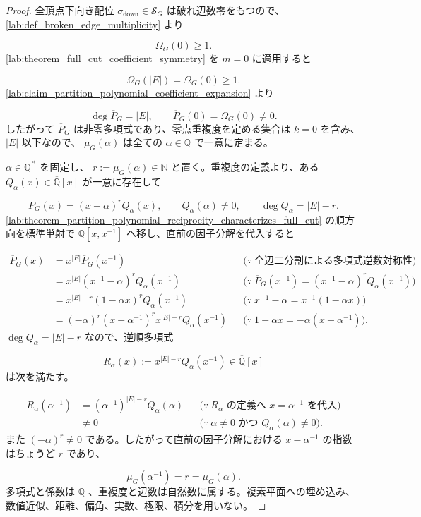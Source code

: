 \documentclass[11pt,a4paper]{article}
\theoremstyle{remark}
\begin{document}
\begin{proof}
全頂点下向き配位 
$\sigma_{\mathsf{down}}\in\mathcal S_G$
 は破れ辺数零をもつので、
\cref{lab:def_broken_edge_multiplicity}
 より

\[\Omega_G(0)\geq1.\]
\cref{lab:theorem_full_cut_coefficient_symmetry}
 を 
$m=0$
 に適用すると

\[\Omega_G(|E|)=\Omega_G(0)\geq1.\]
\cref{lab:claim_partition_polynomial_coefficient_expansion}
 より

\[\deg\overline P_G=|E|,
\qquad
\overline P_G(0)=\Omega_G(0)\ne0.\]
したがって 
$\overline P_G$
 は非零多項式であり、零点重複度を定める集合は 
$k=0$
 を含み、
$|E|$
 以下なので、
$\mu_G(\alpha)$
 は全ての 
$\alpha\in\overline{\mathbb Q}$
 で一意に定まる。

$\alpha\in\overline{\mathbb Q}^{\times}$
 を固定し、
$r:=\mu_G(\alpha)\in\mathbb N$
 と置く。重複度の定義より、ある 
$Q_\alpha(x)\in\overline{\mathbb Q}[x]$
 が一意に存在して

\[\overline P_G(x)=(x-\alpha)^rQ_\alpha(x),
\qquad
Q_\alpha(\alpha)\ne0,
\qquad
\deg Q_\alpha=|E|-r.\]
\cref{lab:theorem_partition_polynomial_reciprocity_characterizes_full_cut}
 の順方向を標準単射で 
$\overline{\mathbb Q}[x,x^{-1}]$
 へ移し、直前の因子分解を代入すると

\[\begin{aligned}
\overline P_G(x)
&=x^{|E|}\overline P_G(x^{-1})
&&\bigl(\because\ \text{全辺二分割による多項式逆数対称性}\bigr)\\
&=x^{|E|}(x^{-1}-\alpha)^rQ_\alpha(x^{-1})
&&\bigl(\because\ \overline P_G(x^{-1})=(x^{-1}-\alpha)^rQ_\alpha(x^{-1})\bigr)\\
&=x^{|E|-r}(1-\alpha x)^rQ_\alpha(x^{-1})
&&\bigl(\because\ x^{-1}-\alpha=x^{-1}(1-\alpha x)\bigr)\\
&=(-\alpha)^r(x-\alpha^{-1})^r x^{|E|-r}Q_\alpha(x^{-1})
&&\bigl(\because\ 1-\alpha x=-\alpha(x-\alpha^{-1})\bigr).
\end{aligned}\]
$\deg Q_\alpha=|E|-r$
 なので、逆順多項式

\[R_\alpha(x):=x^{|E|-r}Q_\alpha(x^{-1})
\in\overline{\mathbb Q}[x]\]
は次を満たす。

\[\begin{aligned}
R_\alpha(\alpha^{-1})
&=(\alpha^{-1})^{|E|-r}Q_\alpha(\alpha)
&&\bigl(\because\ R_\alpha\text{ の定義へ }x=\alpha^{-1}\text{ を代入}\bigr)\\
&\ne0
&&\bigl(\because\ \alpha\ne0\text{ かつ }Q_\alpha(\alpha)\ne0\bigr).
\end{aligned}\]
また 
$(-\alpha)^r\ne0$
 である。したがって直前の因子分解における 
$x-\alpha^{-1}$
 の指数はちょうど 
$r$
 であり、

\[\mu_G(\alpha^{-1})=r=\mu_G(\alpha).\]
多項式と係数は 
$\overline{\mathbb Q}$
、重複度と辺数は自然数に属する。複素平面への埋め込み、数値近似、距離、偏角、実数、極限、積分を用いない。

\end{proof}
\end{document}
